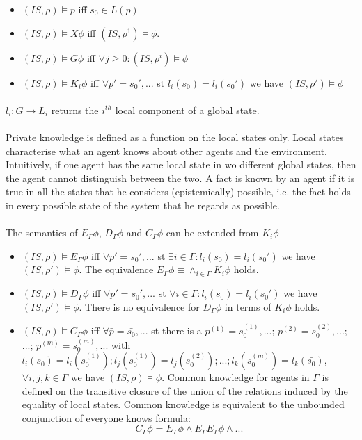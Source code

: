 \documentclass{article}
\theoremstyle{plain}
\theoremstyle{definition}
\begin{document}
\begin{multicols}{2}
\begin{itemize}
\item $(IS, \rho) \models p$ iff $s_0 \in L(p)$
\item $(IS, \rho) \models X\phi$ iff $(IS, \rho^1) \models \phi$.
\item $(IS, \rho) \models G\phi$ iff $\forall j \geq 0: (IS, \rho^i) \models \phi$
\item $(IS, \rho) \models K_i\phi$ iff $\forall p' = s_0',...$ st $l_i(s_0) = l_i(s_0')$ we have $(IS, \rho') \models \phi$
\end{itemize}

\paragraph{} $l_i: G \rightarrow L_i$ returns the $i^{th}$ local component of a global state.

\paragraph{} Private knowledge is defined as a function on the local states only. Local states characterise what an agent knows about other agents and the environment. Intuitively, if one agent has the same local state in wo different global states, then the agent cannot distinguish between the two. A fact is known by an agent if it is true in all the states that he considers (epistemically) possible, i.e. the fact holds in every possible state of the system that he regards as possible.

\paragraph{} The semantics of $E_\Gamma \phi$, $D_\Gamma \phi$ and $C_\Gamma \phi$ can be extended from $K_i\phi$

\begin{itemize}
\item $(IS, \rho) \models E_\Gamma \phi$ iff $\forall p' = s_0',...$ st $\exists i \in \Gamma: l_i(s_0) = l_i(s_0')$ we have $(IS, \rho') \models \phi$. The equivalence $E_\Gamma \phi \equiv \land_{i \in \Gamma} K_i \phi$ holds.
\item $(IS, \rho) \models D_\Gamma \phi$ iff $\forall p' = s_0',...$ st $\forall i \in \Gamma: l_i(s_0) = l_i(s_0')$ we have $(IS, \rho') \models \phi$. There is no equivalence for $D_\Gamma \phi$ in terms of $K_i \phi$ holds.
\item $(IS, \rho) \models C_\Gamma \phi$ iff $\forall \bar{p} = \bar{s_0},...$ st there is a $p^{(1)} = s_0^{(1)},...$; $p^{(2)} = s_0^{(2)},...$; ...; $p^{(m)} = s_0^{(m)},...$ with $l_i(s_0) = l_i(s_0^{(1)}); l_j(s_0^{(1)}) = l_j(s_0^{(2)});...;l_k(s_0^{(m)}) = l_k(\bar{s_0})$, $\forall i,j,k \in \Gamma$ we have $(IS, \bar{\rho}) \models \phi$. Common knowledge for agents in $\Gamma$ is defined on the transitive closure of the union of the relations induced by the equality of local states. Common knowledge is equivalent to the unbounded conjunction of everyone knows formula: $$C_\Gamma \phi = E_\Gamma \phi \land E_\Gamma E_\Gamma \phi \land ...$$
\end{itemize}


\end{multicols}
\end{document}
